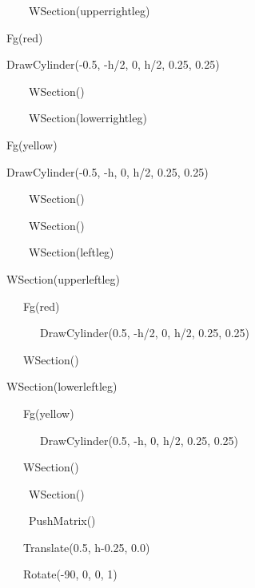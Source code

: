 \documentclass[letterpaper]{article}
\begin{document}
{{\sffamily
\ \ \ \ \ \ WSection({\textquotedbl}upperrightleg{\textquotedbl})}

{\sffamily
\ \  Fg({\textquotedbl}red{\textquotedbl})}

{\sffamily
\ \  DrawCylinder(-0.5, -h/2, 0, h/2, 0.25, 0.25)}

{\sffamily
\ \ \ \ \ \ WSection()}

{\sffamily
\ \ \ \ \ \ WSection({\textquotedbl}lowerrightleg{\textquotedbl})}

{\sffamily
\ \  Fg({\textquotedbl}yellow{\textquotedbl})}

{\sffamily
\ \  DrawCylinder(-0.5, -h, 0, h/2, 0.25, 0.25)}

{\sffamily
\ \ \ \ \ \ WSection()}

{\sffamily
\ \ \ \ \ \ WSection()}

{\sffamily
\ \ \ \ \ \ WSection({\textquotedbl}leftleg{\textquotedbl})}

{\sffamily
\ \  WSection({\textquotedbl}upperleftleg{\textquotedbl})\ \ }

{\sffamily
\ \  \ \ \ Fg({\textquotedbl}red{\textquotedbl})}

{\sffamily
\ \ \ \ \  \ \ \ DrawCylinder(0.5, -h/2, 0, h/2, 0.25, 0.25)}

{\sffamily
\ \ \ \ \  WSection()}

{\sffamily
\ \  WSection({\textquotedbl}lowerleftleg{\textquotedbl})\ }

{\sffamily
\ \  \ \ \ Fg({\textquotedbl}yellow{\textquotedbl})}

{\sffamily
\ \ \ \ \  \ \ \ DrawCylinder(0.5, -h, 0, h/2, 0.25, 0.25)}

{\sffamily
\ \ \ \ \  WSection()}

{\sffamily
\ \ \ \ \ \ WSection()}

{\sffamily
\ \ \ \ \ \ PushMatrix()}

{\sffamily
\ \ \ \ \  Translate(0.5, h-0.25, 0.0)}

{\sffamily
\ \ \ \ \  Rotate(-90, 0, 0, 1)}

}
\end{document}
